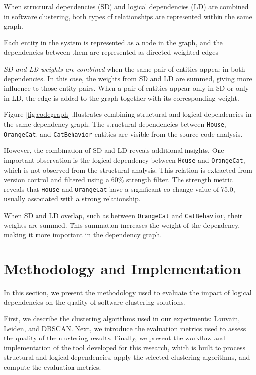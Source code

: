 \documentclass[12pt, a4paper, twoside]{report}
\begin{document}
When structural dependencies (SD) and logical dependencies (LD) are combined in software clustering, both types of relationships are represented within the same graph.

Each entity in the system is represented as a node in the graph, and the dependencies between them are represented as directed weighted edges.

\textit{SD and LD weights are combined} when the same pair of entities appear in both dependencies. In this case, the weights from SD and LD are summed, giving more influence to those entity pairs. When a pair of entities appear only in SD or only in LD, the edge is added to the graph together with its corresponding weight.

Figure \ref{fig:codegraph} illustrates combining structural and logical dependencies in the same dependency graph. The structural dependencies between \texttt{House}, \texttt{OrangeCat}, and \texttt{CatBehavior} entities are visible from the source code analysis.

However, the combination of SD and LD reveals additional insights. One important observation is the logical dependency between \texttt{House} and \texttt{OrangeCat}, which is not observed from the structural analysis. This relation is extracted from version control and filtered using a 60\% strength filter. The strength metric reveals that \texttt{House} and \texttt{OrangeCat} have a significant co-change value of 75.0, usually associated with a strong relationship.

When SD and LD overlap, such as between \texttt{OrangeCat} and \texttt{CatBehavior}, their weights are summed. This summation increases the weight of the dependency, making it more important in the dependency graph.





\section{Methodology and Implementation}
\label{sec:methodology_implementation}

In this section, we present the methodology used to evaluate the impact of logical dependencies on the quality of software clustering solutions.

First, we describe the clustering algorithms used in our experiments: Louvain, Leiden, and DBSCAN. Next, we introduce the evaluation metrics used to assess the quality of the clustering results. Finally, we present the workflow and implementation of the tool developed for this research, which is built to process structural and logical dependencies, apply the selected clustering algorithms, and compute the evaluation metrics.
\end{document}
